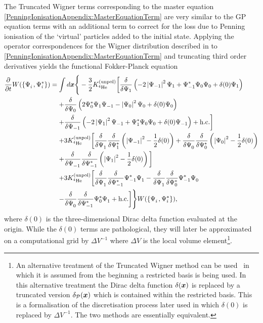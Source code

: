 The Truncated Wigner terms corresponding to the master equation \eqref{PenningIonisationAppendix:MasterEquationTerm} are very similar to the GP equation terms with an additional term to correct for the loss due to Penning ionisation of the `virtual' particles added to the initial state. Applying the operator correspondences for the Wigner distribution described in  to \eqref{PenningIonisationAppendix:MasterEquationTerm} and truncating third order derivatives yields the functional Fokker-Planck equation
\begin{align}
    \begin{split}
    \frac{\partial}{\partial t} W(\left\{ \Psi_i^{\phantom{*}}, \Psi_i^*\right\}) &= \int d \vect{x} \Bigg\{ -\frac{3}{2}\Kunpol\bigg[\frac{\delta}{\delta \Psi_1}\left(-2 \abs{\Psi_{-1}}^2\Psi_1 +\Psi_{-1}^*\Psi_0\Psi_0  + \delta(0) \Psi_1\right)\\
    &\relphantom{=} +\frac{\delta}{\delta \Psi_0}\left(2 \Psi_0^* \Psi_1 \Psi_{-1}  - \abs{\Psi_0}^2 \Psi_0 + \delta(0) \Psi_0\right)\\
    &\relphantom{=} +\frac{\delta}{\delta \Psi_{-1}}\left(- 2 \abs{\Psi_1}^2 \Psi_{-1} + \Psi_1^* \Psi_0 \Psi_0  + \delta(0) \Psi_{-1}\right) + \text{h.c.} \bigg]\\
    &\relphantom{=} + 3 \Kunpol \bigg[\frac{\delta}{\delta \Psi_1^{\phantom{*}}} \frac{\delta}{\delta \Psi_1^*}\left(\abs{\Psi_{-1}}^2 - \frac{1}{2} \delta(0)\right) + \frac{\delta}{\delta \Psi_0^{\phantom{*}}} \frac{\delta}{\delta \Psi_0^*}\left(\abs{\Psi_0}^2 - \frac{1}{2} \delta(0)\right) \\
    &\relphantom{=} + \frac{\delta}{\delta \Psi_{-1}^{\phantom{*}}} \frac{\delta}{\delta \Psi_{-1}^*} \left(\abs{\Psi_1}^2 - \frac{1}{2}\delta(0)\right)\bigg] \\
    &\relphantom{=} +3 \Kunpol\bigg[\frac{\delta}{\delta \Psi_1^{\phantom{*}}}\frac{\delta}{\delta \Psi_{-1}^*}\Psi_{-1}^*\Psi_{1}^{\phantom{*}}  - \frac{\delta}{\delta \Psi_{1}^{\phantom{*}}}\frac{\delta}{\delta \Psi_0^*}\Psi_{-1}^* \Psi_0^{\phantom{*}} \\
    &\relphantom{=} - \frac{\delta}{\delta \Psi_0^{\phantom{*}}}\frac{\delta}{\delta \Psi_{-1}^*} \Psi_0^* \Psi_1^{\phantom{*}} + \text{h.c.} \bigg]\Bigg\}W(\left\{\Psi_i^{\phantom{*}}, \Psi_i^* \right\}),
    \end{split}
    \label{PenningIonisationAppendix:FunctionalFokkerPlanckEquation}
\end{align}
where $\delta(0)$ is the three-dimensional Dirac delta function evaluated at the origin. While the $\delta(0)$ terms are pathological, they will later be approximated on a computational grid by $\Delta V^{-1}$ where $\Delta V$ is the local volume element\footnote{An alternative treatment of the Truncated Wigner method can be used~\citep{Norrie:2006vn,Norrie:2006kx} in which it is assumed from the beginning a restricted basis is being used.  In this alternative treatment the Dirac delta function $\delta(\bm{x})$ is replaced by a truncated version $\delta_\mathcal{P}(\bm{x})$ which is contained within the restricted basis. This is a formalisation of the discretisation process later used in which $\delta(0)$ is replaced by $\Delta V^{-1}$.  The two methods are essentially equivalent.}.

